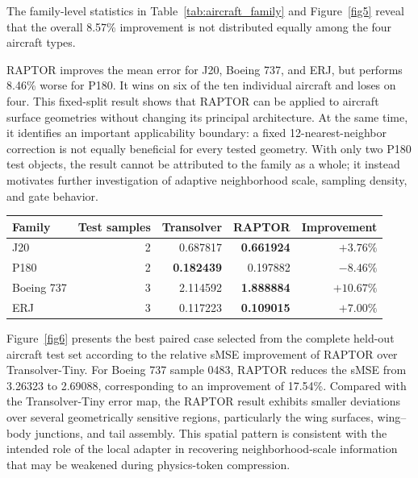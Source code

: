 \documentclass[a4paper,fleqn]{cas-sc}
\begin{document}
The family-level statistics in Table~\ref{tab:aircraft_family} and
Figure~\ref{fig5} reveal that the overall 8.57\%
improvement is not distributed equally among the four aircraft types.




RAPTOR improves the mean error for J20, Boeing 737, and ERJ, but performs
8.46\% worse for P180. It wins on six of the ten individual aircraft and
loses on four. This fixed-split result shows that RAPTOR can be applied to aircraft
surface geometries without changing its principal architecture. At the same
time, it identifies an important applicability boundary: a fixed
12-nearest-neighbor correction is not equally beneficial for every tested
geometry. With only two P180 test objects, the result cannot be attributed to
the family as a whole; it instead motivates further investigation of adaptive
neighborhood scale, sampling density, and gate behavior.

\begin{center}
    \begin{minipage}{0.82\linewidth}
        \centering
    \label{tab:aircraft_family}
    \renewcommand{\arraystretch}{1.10}
    \setlength{\tabcolsep}{4.5pt}
    \begin{tabular}{lrrrr}
        \toprule
        Family
        & Test samples
        & Transolver
        & RAPTOR
        & Improvement \\
        \midrule
        J20
        & 2 & 0.687817 & \textbf{0.661924} & \(+3.76\%\) \\
        P180
        & 2 & \textbf{0.182439} & 0.197882 & \(-8.46\%\) \\
        Boeing 737
        & 3 & 2.114592 & \textbf{1.888884} & \(+10.67\%\) \\
        ERJ
        & 3 & 0.117223 & \textbf{0.109015} & \(+7.00\%\) \\
        \bottomrule
    \end{tabular}
    \end{minipage}
\end{center}

Figure~\ref{fig6} presents the best paired case selected from the
complete held-out aircraft test set according to the relative
sMSE improvement of RAPTOR over Transolver-Tiny. For Boeing
737 sample 0483, RAPTOR reduces the sMSE from 3.26323 to 2.69088,
corresponding to an improvement of 17.54\%. Compared with the
Transolver-Tiny error map, the RAPTOR result exhibits smaller deviations
over several geometrically sensitive regions, particularly the wing
surfaces, wing--body junctions, and tail assembly. This spatial pattern
is consistent with the intended role of the local adapter in recovering
neighborhood-scale information that may be weakened during
physics-token compression.
\end{document}
